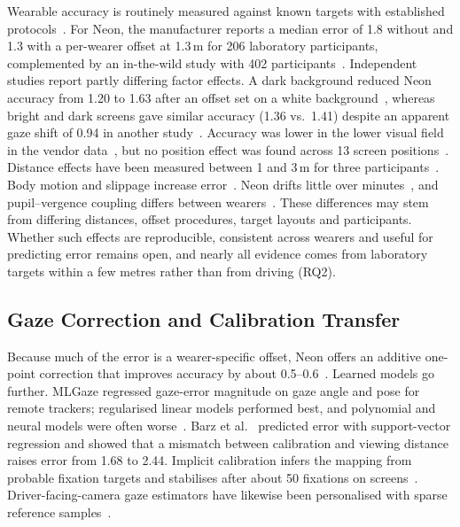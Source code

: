 Wearable accuracy is routinely measured against known targets with
established protocols~\cite{niehorster2024glassesvalidator,niehorster2026fundamentals7}.
For Neon, the manufacturer reports a median error of 1.8\dg{} without and
1.3\dg{} with a per-wearer offset at 1.3\,m for 206 laboratory
participants, complemented by an in-the-wild study with 402
participants~\cite{baumann2026neonAccuracy}. Independent studies report
partly differing factor effects. A dark background reduced Neon accuracy
from 1.20\dg{} to 1.63\dg{} after an offset set on a white
background~\cite{alecka2026neon}, whereas bright and dark screens gave
similar accuracy (1.36\dg{} vs.\ 1.41\dg{}) despite an apparent gaze shift
of 0.94\dg{} in another study~\cite{salari2026pupilSize}. Accuracy was
lower in the lower visual field in the vendor
data~\cite{baumann2026neonAccuracy}, but no position effect was found
across 13 screen positions~\cite{alecka2026neon}. Distance effects have
been measured between 1 and 3\,m for three
participants~\cite{macinnes2018wearable}. Body motion and slippage increase
error~\cite{hooge2023robust,onkhar2024evaluating,pettenella2026slippage}. Neon drifts little over
minutes~\cite{foucher2026neon,nolte2026bestPractices}, and
pupil--vergence coupling differs between
wearers~\cite{maquiling2026vergencePupil}. These differences may stem from differing distances, offset
procedures, target layouts and participants.
Whether such effects are reproducible, consistent across
wearers and useful for predicting error remains open,
and nearly all evidence comes from laboratory targets
within a few metres rather than from driving (RQ2).

\subsection{Gaze Correction and Calibration Transfer}

Because much of the error is a wearer-specific offset, Neon offers an
additive one-point correction that improves accuracy by about
0.5--0.6\dg{}~\cite{baumann2026neonAccuracy,foucher2026neon}. Learned
models go further. MLGaze regressed gaze-error magnitude on gaze angle and pose for
remote trackers; regularised linear models performed best, and
polynomial and neural models were often
worse~\cite{kar2020mlgaze}. Barz et
al.~\cite{barz2016prediction} predicted error with support-vector
regression and showed that a mismatch between calibration and viewing
distance raises error from 1.68\dg{} to 2.44\dg{}. Implicit calibration
infers the mapping from probable fixation targets and stabilises after
about 50 fixations on
screens~\cite{kasprowski2019implicitCalibration,chang2019salgaze}. 
Driver-facing-camera gaze estimators have likewise been personalised
with sparse reference samples~\cite{nagpure2025learningToAdapt}.


